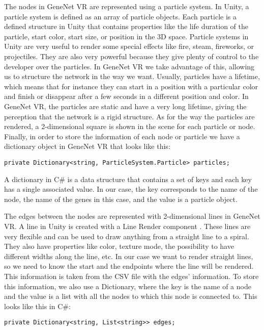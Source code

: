 The nodes in GeneNet VR are represented using a particle system. In Unity, a particle system \cite{particle_system} is defined as an array of particle objects. Each particle is a defined structure in Unity that contains properties like the life duration of the particle, start color, start size, or position in the 3D space. Particle systems in Unity are very useful to render some special effects like fire, steam, fireworks, or projectiles. They are also very powerful because they give plenty of control to the developer over the particles. In GeneNet VR we take advantage of this, allowing us to structure the network in the way we want. Usually, particles have a lifetime, which means that for instance they can start in a position with a particular color and finish or disappear after a few seconds in a different position and color. In GeneNet VR, the particles are static and have a very long lifetime, giving the perception that the network is a rigid structure. As for the way the particles are rendered, a 2-dimensional square is shown in the scene for each particle or node. Finally, in order to store the information of each node or particle we have a dictionary object in GeneNet VR that looks like this:

\begin{verbatim}
private Dictionary<string, ParticleSystem.Particle> particles;
\end{verbatim}

A dictionary in C\# is a data structure that contains a set of keys and each key has a single associated value. In our case, the key corresponds to the name of the node, the name of the genes in this case, and the value is a particle object.

The edges between the nodes are represented with 2-dimensional lines in GeneNet VR. A line in Unity is created with a Line Render component \cite{line_render}. These lines are very flexible and can be used to draw anything from a straight line to a spiral. They also have properties like color, texture mode, the possibility to have different widths along the line, etc. In our case we want to render straight lines, so we need to know the start and the endpoints where the line will be rendered. This information is taken from the CSV file with the edges' information. To store this information, we also use a Dictionary, where the key is the name of a node and the value is a list with all the nodes to which this node is connected to. This looks like this in C\#:

\begin{verbatim}
private Dictionary<string, List<string>> edges;
\end{verbatim}

